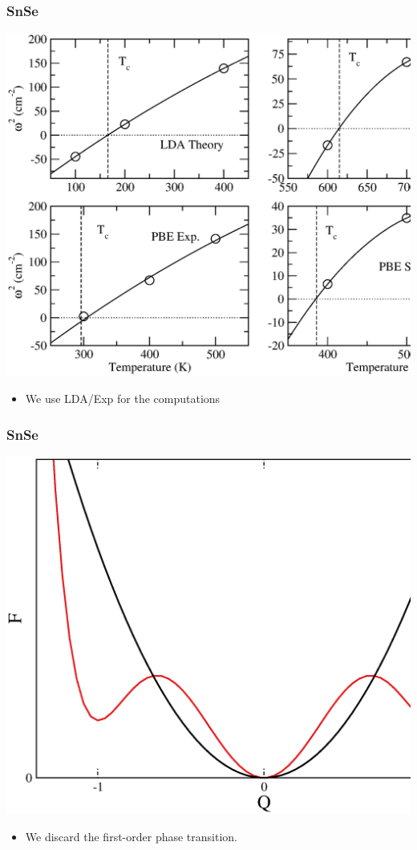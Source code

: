 \documentclass{beamer}
\begin{document}
\begin{frame}

\frametitle{SnSe}
\begin{center}
  \includegraphics[width=0.85\linewidth]{Pictures/SnSe/freq-main.eps}
\end{center}
\vspace{-0.2cm}
\begin{itemize}
\item We use LDA/Exp for the computations 
\end{itemize}

\end{frame}


\begin{frame}

 \frametitle{SnSe}
 \vspace{-0.5cm}
 \begin{center}
  \includegraphics[width=0.75\linewidth]{Pictures/SnSe/data-case.eps}
 \end{center}
 \begin{itemize}
  \item We discard the first-order phase transition.
 \end{itemize}

\end{frame}
\end{document}
